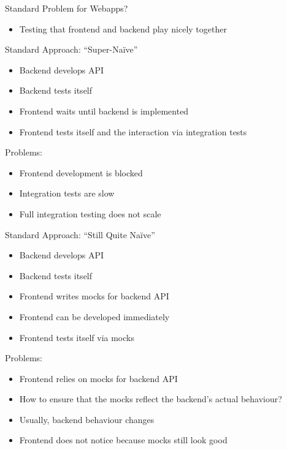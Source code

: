 \begin{frame}[fragile]{Standard Problem for Webapps?}

\begin{itemize}
\item Testing that frontend and backend play nicely together
\end{itemize}

\end{frame}

\begin{frame}[fragile]{Standard Approach: ``Super-Na\"ive''}

\begin{itemize}
\item Backend develops API
\item Backend tests itself
\item Frontend waits until backend is implemented
\item Frontend tests itself and the interaction via integration tests
\end{itemize}

Problems:

\begin{itemize}
\item Frontend development is blocked
\item Integration tests are slow
\item Full integration testing does not scale
\end{itemize}


\end{frame}

\begin{frame}[fragile]{Standard Approach: ``Still Quite Na\"ive''}

\begin{itemize}
\item Backend develops API
\item Backend tests itself
\item Frontend writes mocks for backend API
\item Frontend can be developed immediately
\item Frontend tests itself via mocks
\end{itemize}

Problems:

\begin{itemize}
\item Frontend relies on mocks for backend API
\item How to ensure that the mocks reflect the backend's actual behaviour?
\item Usually, backend behaviour changes
\item Frontend does not notice because mocks still look good
\end{itemize}

\end{frame}


